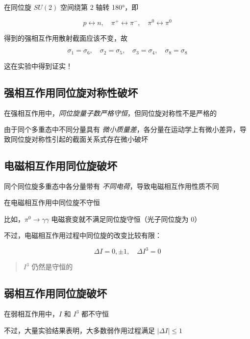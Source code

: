 在同位旋 $SU(2)$ 空间绕第 $2$ 轴转 \ang{180}，即

\begin{equation}
    p \leftrightarrow n, \quad \pi^+ \leftrightarrow \pi^-, \quad \pi^0 \leftrightarrow \pi^0
\end{equation}

得到的强相互作用散射截面应该不变，故

\begin{equation}
    \sigma_1 = \sigma_6, \quad \sigma_2 = \sigma_5, \quad \sigma_3 = \sigma_4, \quad \sigma_8 = \sigma_8
\end{equation}

这在实验中得到证实！

\subsection{强相互作用同位旋对称性破坏}

在强相互作用中，\emph{同位旋量子数严格守恒}，但同位旋对称性不是严格的

由于同个多重态中不同分量具有 \emph{微小质量差}，各分量在运动学上有微小差异，导致同位旋对称性引起的截面关系式存在微小破坏

\subsection{电磁相互作用同位旋破坏}

同个同位旋多重态中各分量带有 \emph{不同电荷}，导致电磁相互作用性质不同

在电磁相互作用中同位旋不守恒

比如，$\pi^0 \to \gamma\gamma$ 电磁衰变就不满足同位旋守恒（光子同位旋为 $0$）

不过，电磁相互作用过程中同位旋的改变比较有限：

\begin{equation}
    \Delta I = 0, \pm 1, \quad \Delta I^3 = 0
\end{equation}

\begin{quote}
    $I^3$ 仍然是守恒的
\end{quote}

\subsection{弱相互作用同位旋破坏}

在弱相互作用中，$I$ 和 $I^3$ 都不守恒

不过，大量实验结果表明，大多数弱作用过程满足 $|\Delta I| \le 1$

